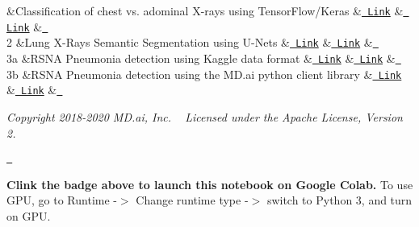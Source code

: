 \begin{DoxyItemize}
\begin{longtabu}
   &Classification of chest vs. adominal X-\/rays using Tensor\+Flow/\+Keras   &\href{https://github.com/mdai/ml-lessons/blob/master/lesson1-xray-images-classification.ipynb}{\texttt{ Link}}   &\href{https://public.md.ai/annotator/project/PVq9raBJ}{\texttt{ Link}}   &\href{https://colab.research.google.com/github/mdai/ml-lessons/blob/master/lesson1-xray-images-classification.ipynb}{\texttt{ }}    \\
2   &Lung X-\/\+Rays Semantic Segmentation using U-\/\+Nets   &\href{https://github.com/mdai/ml-lessons/blob/master/lesson2-lung-xrays-segmentation.ipynb}{\texttt{ Link}}   &\href{https://public.md.ai/annotator/project/aGq4k6NW}{\texttt{ Link}}   &\href{https://colab.research.google.com/github/mdai/ml-lessons/blob/master/lesson2-lung-xrays-segmentation.ipynb}{\texttt{ }}    \\
3a   &RSNA Pneumonia detection using Kaggle data format   &\href{https://github.com/mdai/ml-lessons/blob/master/lesson3-rsna-pneumonia-detection-kaggle.ipynb}{\texttt{ Link}}   &\href{https://public.md.ai/annotator/project/LxR6zdR2}{\texttt{ Link}}   &\href{https://colab.research.google.com/github/mdai/ml-lessons/blob/master/lesson3-rsna-pneumonia-detection-kaggle.ipynb}{\texttt{ }}    \\
3b   &RSNA Pneumonia detection using the MD.\+ai python client library   &\href{https://github.com/mdai/ml-lessons/blob/master/lesson3-rsna-pneumonia-detection-mdai-client-lib.ipynb}{\texttt{ Link}}   &\href{https://public.md.ai/annotator/project/LxR6zdR2}{\texttt{ Link}}   &\href{https://colab.research.google.com/github/mdai/ml-lessons/blob/master/lesson3-rsna-pneumonia-detection-mdai-client-lib.ipynb}{\texttt{ }}   \\
\end{longtabu}
{\itshape Copyright 2018-\/2020 MD.\+ai, Inc. ~\newline
 Licensed under the Apache License, Version 2.}
\end{DoxyItemize}

\href{https://colab.research.google.com/github/mdai/ml-lessons/blob/master/lesson2-lung-xrays-segmentation.ipynb}{\texttt{ }}

{\bfseries{Clink the badge above to launch this notebook on Google Colab.}} To use GPU, go to Runtime -\/\texorpdfstring{$>$}{>} Change runtime type -\/\texorpdfstring{$>$}{>} switch to Python 3, and turn on GPU. 